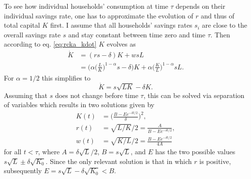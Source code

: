To see how individual households' consumption at time $\tau$ depends on their individual savings rate, one has to approximate the evolution of $r$ and thus of total capital $K$ first. I assume that all households' savings rates $s_i$ are close to the overall savings rate $s$ and stay constant between time zero and time $\tau$. 
Then according to eq. \eqref{eq:rcka_kdot} $K$ evolves as 
\begin{equation}
    \begin{split}
    \dot K &= (r s - \delta) K + w s L \nonumber \\
    	   &= \Big(\alpha\Big(\frac{L}{K}\Big)^{1-\alpha} s - \delta\Big) K + \alpha \Big(\frac{K}{L}\Big)^{1-\alpha} s L.  
	\end{split}
\end{equation}
For $\alpha = 1/2$ this simplifies to 
\begin{equation}
    \label{aggKdotnew}
    \dot{K} = s\sqrt{L K} - \delta K.
\end{equation}
Assuming that $s$ does not change before time $\tau$, this can be solved via separation of variables which results in two solutions given by 
\begin{equation}
\begin{split}
    K(t) &= \Big(\frac{B - E e^{-\delta t/2}}{\delta} \Big)^2, \\
    r(t) &= \sqrt{L/K} / 2 = \frac{A}{B - E e^{-\delta t/2}}, \\
    w(t) &= \sqrt{K/L} / 2 = \frac{B - E e^{-\delta t/2}}{4 A}
\end{split}
\end{equation}
for all $t < \tau$,
where 
$A = \delta \sqrt{L} / 2$,
$B = s\sqrt{L}$,
and
$E$ has the two possible values $s\sqrt{L} \pm \delta \sqrt{K_0}$.
Since the only relevant solution is that in which $r$ is positive, subsequently $E = s\sqrt{L} - \delta \sqrt{K_0} < B$.

